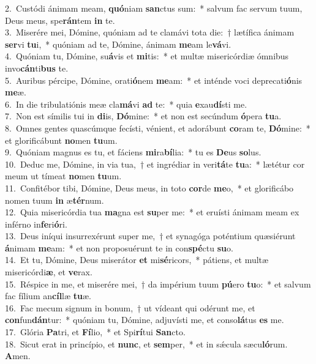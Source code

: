 {2.~}Custódi ánimam meam, \textbf{quó}niam \textbf{san}ctus sum:~* salvum fac servum tuum, Deus meus, spe\textbf{rán}tem \textbf{in} te.\\
{3.~}Miserére mei, Dómine, quóniam ad te clamávi tota die:~† lætífica ánimam \textbf{ser}vi \textbf{tu}i,~* quóniam ad te, Dómine, ánimam \textbf{me}am le\textbf{vá}vi.\\
{4.~}Quóniam tu, Dómine, su\textbf{á}vis et \textbf{mi}tis:~* et multæ misericórdiæ ómnibus invo\textbf{cán}ti\textbf{bus} te.\\
{5.~}Auribus pércipe, Dómine, orati\textbf{ó}nem \textbf{me}am:~* et inténde voci deprecati\textbf{ó}nis \textbf{me}æ.\\
{6.~}In die tribulatiónis meæ cla\textbf{má}vi \textbf{ad} te:~* quia \textbf{e}xau\textbf{dí}sti me.\\
{7.~}Non est símilis tui in \textbf{di}is, \textbf{Dó}mine:~* et non est secúndum \textbf{ó}pera \textbf{tu}a.\\
{8.~}Omnes gentes quascúmque fecísti, vénient, et adorábunt \textbf{co}ram te, \textbf{Dó}mine:~* et glorificábunt \textbf{no}men \textbf{tu}um.\\
{9.~}Quóniam magnus es tu, et fáciens \textbf{mi}ra\textbf{bí}lia:~* tu es \textbf{De}us \textbf{so}lus.\\
{10.~}Deduc me, Dómine, in via tua,~† et ingrédiar in veri\textbf{tá}te \textbf{tu}a:~* lætétur cor meum ut tímeat \textbf{no}men \textbf{tu}um.\\
{11.~}Confitébor tibi, Dómine, Deus meus, in toto \textbf{cor}de \textbf{me}o,~* et glorificábo nomen tuum \textbf{in} æ\textbf{tér}num.\\
{12.~}Quia misericórdia tua \textbf{ma}gna est \textbf{su}per me:~* et eruísti ánimam meam ex inférno in\textbf{fe}ri\textbf{ó}ri.\\
{13.~}Deus iníqui insurrexérunt super me,~† et synagóga poténtium quæsiérunt \textbf{á}nimam \textbf{me}am:~* et non proposuérunt te in con\textbf{spé}ctu \textbf{su}o.\\
{14.~}Et tu, Dómine, Deus miserátor \textbf{et} mi\textbf{sé}ricors,~* pátiens, et multæ misericórdi\textbf{æ}, et \textbf{ve}rax.\\
{15.~}Réspice in me, et miserére mei,~† da impérium tuum \textbf{pú}ero \textbf{tu}o:~* et salvum fac fílium an\textbf{cíl}læ \textbf{tu}æ.\\
{16.~}Fac mecum signum in bonum,~† ut vídeant qui odérunt me, et \textbf{con}fun\textbf{dán}tur:~* quóniam tu, Dómine, adjuvísti me, et conso\textbf{lá}tus \textbf{es} me.\\
{17.~}Glória \textbf{Pa}tri, et \textbf{Fí}lio,~* et Spi\textbf{rí}tui \textbf{San}cto.\\
{18.~}Sicut erat in princípio, et \textbf{nunc}, et \textbf{sem}per,~* et in sǽcula sæcu\textbf{ló}rum. \textbf{A}men.\\
